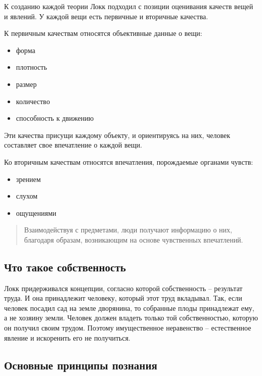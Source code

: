 \documentclass[
]{article}
\providecommand{\tightlist}{%
  \setlength{\itemsep}{0pt}\setlength{\parskip}{0pt}}
\begin{document}
К созданию каждой теории Локк подходил с позиции оценивания качеств
вещей и явлений. У каждой вещи есть первичные и вторичные качества.

К первичным качествам относятся объективные данные о вещи:

\begin{itemize}
\tightlist
\item
  форма
\item
  плотность
\item
  размер
\item
  количество
\item
  способность к движению
\end{itemize}

Эти качества присущи каждому объекту, и ориентируясь на них, человек
составляет свое впечатление о каждой вещи.

Ко вторичным качествам относятся впечатления, порождаемые органами
чувств:

\begin{itemize}
\tightlist
\item
  зрением
\item
  слухом
\item
  ощущениями
\end{itemize}

\begin{quote}
Взаимодействуя с предметами, люди получают информацию о них, благодаря
образам, возникающим на основе чувственных впечатлений.
\end{quote}

\hypertarget{ux447ux442ux43e-ux442ux430ux43aux43eux435-ux441ux43eux431ux441ux442ux432ux435ux43dux43dux43eux441ux442ux44c}{%
\subsection{Что такое
собственность}\label{ux447ux442ux43e-ux442ux430ux43aux43eux435-ux441ux43eux431ux441ux442ux432ux435ux43dux43dux43eux441ux442ux44c}}

Локк придерживался концепции, согласно которой собственность --
результат труда. И она принадлежит человеку, который этот труд
вкладывал. Так, если человек посадил сад на земле дворянина, то
собранные плоды принадлежат ему, а не хозяину земли. Человек должен
владеть только той собственностью, которую он получил своим трудом.
Поэтому имущественное неравенство -- естественное явление и искоренить
его не получиться.

\hypertarget{ux43eux441ux43dux43eux432ux43dux44bux435-ux43fux440ux438ux43dux446ux438ux43fux44b-ux43fux43eux437ux43dux430ux43dux438ux44f}{%
\subsection{Основные принципы
познания}\label{ux43eux441ux43dux43eux432ux43dux44bux435-ux43fux440ux438ux43dux446ux438ux43fux44b-ux43fux43eux437ux43dux430ux43dux438ux44f}}
\end{document}
